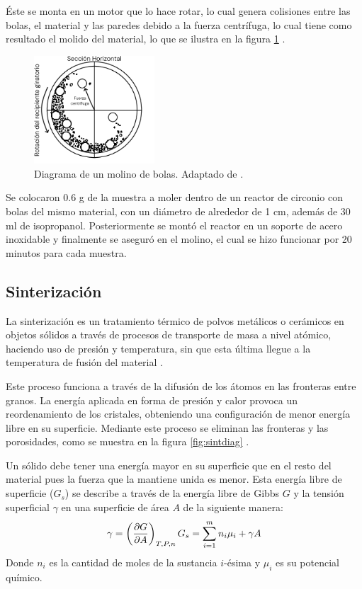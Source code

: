 \documentclass[../main.tex]{subfiles}
\begin{document}
Éste se monta en un motor que lo hace rotar, lo cual genera colisiones entre las bolas, el material y las paredes debido a la fuerza centrífuga, lo cual tiene como resultado el molido del material, lo que se ilustra en la figura \ref{fig:molinodiag} \cite{Baheti2012}.
\begin{figure}[H]
    \centering
    \includegraphics[width=0.4\textwidth]{fig/molinodiag.png}
    \caption{Diagrama de un molino de bolas. Adaptado de \cite{Baheti2012}.}
    \label{fig:molinodiag}
\end{figure}
Se colocaron 0.6 g de la muestra a moler dentro de un reactor de circonio con bolas del mismo material, con un diámetro de alrededor de 1 cm, además de 30 ml de isopropanol. Posteriormente se montó el reactor en un soporte de acero inoxidable y finalmente se aseguró en el molino, el cual se hizo funcionar por 20 minutos para cada muestra.

\subsection{Sinterización} \label{sec:sinter}
La sinterización es un tratamiento térmico de polvos metálicos o cerámicos en objetos sólidos a través de procesos de transporte de masa a nivel atómico, haciendo uso de presión y temperatura, sin que esta última llegue a la temperatura de fusión del material \cite{Banerjee2019}.

Este proceso funciona a través de la difusión de los átomos en las fronteras entre granos. La energía aplicada en forma de presión y calor provoca un reordenamiento de los cristales, obteniendo una configuración de menor energía libre en su superficie. Mediante este proceso se eliminan las fronteras y las porosidades, como se muestra en la figura \ref{fig:sintdiag} \cite{Ou2014}.

Un sólido debe tener una energía mayor en su superficie que en el resto del material pues la fuerza que la mantiene unida es menor. Esta energía libre de superficie ($G_s$) se describe a través de la energía libre de Gibbs $G$ y la tensión superficial $\gamma$ en una superficie de área $A$ de la siguiente manera:
\begin{equation}
    \gamma=\left(\dfrac{\partial G}{\partial A}\right)_{T,P,n}\\
    G_s=\sum_{i=1}^{m} n_i \mu_i + \gamma A
    \label{eq:energiasuperficie}
\end{equation}
Donde $n_i$ es la cantidad de moles de la sustancia $i$-ésima y $\mu_i$ es su potencial químico. 
\end{document}
